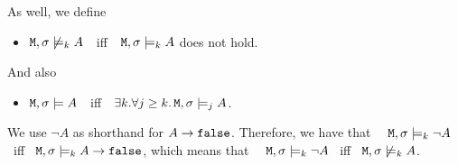 \documentclass[acmsmall,screen]{acmart}
\begin{document}
\begin{definition}
 As well, we define
 \begin{itemize}
  \item
 ${\mbox{\tt{M}}}, \sigma \not\models_k A$\ \  iff\ \  ${\mbox{\tt{M}}}, \sigma\models_k   A$ does not hold. \end{itemize}

And also
\begin{itemize}
\item
${\mbox{\tt{M}}}, \sigma \models  A$\ \  iff\ \  $\exists k.\forall j\geq k. \,  {\mbox{\tt{M}}}, \sigma\models_j  A$.
\end{itemize}

\end{definition}

\begin{note} We use $\neg A$ as shorthand for $A \rightarrow {\mbox{\tt{false}}}$. Therefore, we have that
\ \ ${\mbox{\tt{M}}}, \sigma \models_k \neg A$   \  iff \    ${\mbox{\tt{M}}}, \sigma \models_{k}   A \rightarrow {\mbox{\tt{false}}}$, which means that  \ \
 ${\mbox{\tt{M}}}, \sigma \models_k \neg A$   \  iff \   ${\mbox{\tt{M}}}, \sigma \not\models_{k}   A $.

\end{note}


\end{document}
